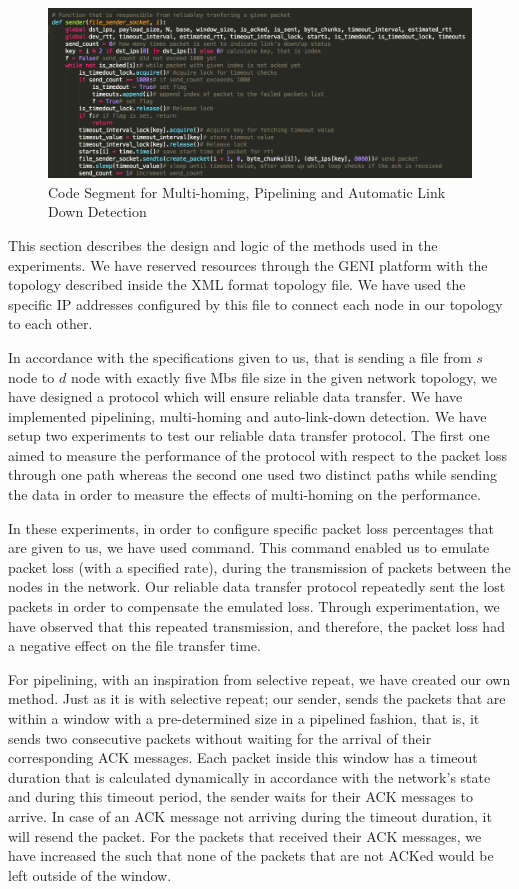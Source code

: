 \documentclass[conference]{IEEEtran}
\begin{document}
\begin{figure}[t]
\caption*{Code Segment for Multi-homing, Pipelining and Automatic Link Down Detection}
\centerline{\includegraphics[width=\textwidth]{sender.png}}
\label{graph}
\end{figure}

    This section describes the design and logic of the methods used in the experiments. We have reserved resources through the GENI platform with the topology described inside the XML format topology file. We have used the specific IP addresses configured by this file to connect each node in our topology to each other. 

    In accordance with the specifications given to us, that is sending a file from $s$ node to $d$ node with exactly five Mbs file size in the given network topology, we have designed a protocol which will ensure reliable data transfer. We have implemented pipelining, multi-homing and auto-link-down detection. We have setup two experiments to test our reliable data transfer protocol. The first one aimed to measure the performance of the protocol with respect to the packet loss through one path whereas the second one used two distinct paths while sending the data in order to measure the effects of multi-homing on the performance. 
    
    In these experiments, in order to configure specific packet loss percentages that are given to us, we have used  command. This command enabled us to emulate packet loss (with a specified rate), during the transmission of packets between the nodes in the network. Our reliable data transfer protocol repeatedly sent the lost packets in order to compensate the emulated loss. Through experimentation, we have observed that this repeated transmission, and therefore, the packet loss had a negative effect on the file transfer time. 
    
    For pipelining, with an inspiration from selective repeat, we have created our own method. Just as it is with selective repeat; our sender, sends the packets that are within a window with a pre-determined size in a pipelined fashion, that is, it sends two consecutive packets without waiting for the arrival of their corresponding ACK messages. Each packet inside this window has a timeout duration that is calculated dynamically in accordance with the network's state and during this timeout period, the sender waits for their ACK messages to arrive. In case of an ACK message not arriving during the timeout duration, it will resend the packet. For the packets that received their ACK messages, we have increased the  such that none of the packets that are not ACKed would be left outside of the window. 
    
\end{document}
